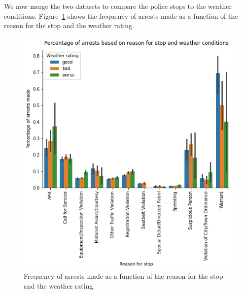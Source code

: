 \documentclass{article}
\begin{document}
We now merge the two datasets to compare the police stops to the weather conditions. Figure~\ref{fig:weather_arrest_reason} shows the frequency of arrests made as a function of the reason for the stop and the weather rating. 

 \begin{figure}[h]
 \centering
\includegraphics[scale=0.7, valign=t]{../figures/fig_arrest_reason_weather.png}
\caption{Frequency of arrests made as a function of the reason for the stop and the weather rating.} \label{fig:weather_arrest_reason}
\end{figure} 


\FloatBarrier
\newpage
 

\end{document}
